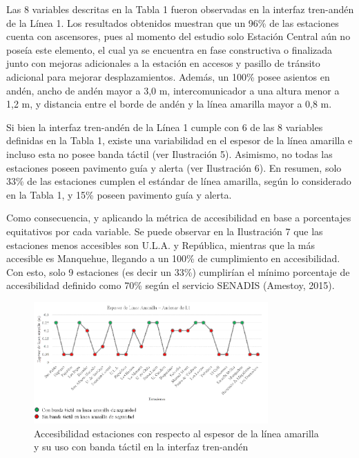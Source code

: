 Las 8 variables descritas en la Tabla 1 fueron observadas en la interfaz tren-andén de la Línea 1. Los resultados obtenidos muestran que un 96\% de las estaciones cuenta con ascensores, pues al momento del estudio solo Estación Central aún no poseía este elemento, el cual ya se encuentra en fase constructiva o finalizada junto con mejoras adicionales a la estación en accesos y pasillo de tránsito adicional para mejorar desplazamientos. Además, un 100\% posee asientos en andén, ancho de andén mayor a 3,0 m, intercomunicador a una altura menor a 1,2 m, y distancia entre el borde de andén y la línea amarilla mayor a 0,8 m. 

Si bien la interfaz tren-andén de la Línea 1 cumple con 6 de las 8 variables definidas en la Tabla 1, existe una variabilidad en el espesor de la línea amarilla e incluso esta no posee banda táctil (ver Ilustración 5). Asimismo, no todas las estaciones poseen pavimento guía y alerta (ver Ilustración 6). En resumen, solo 33\% de las estaciones cumplen el estándar de línea amarilla, según lo considerado en la Tabla 1, y 15\% poseen pavimento guía y alerta. 

Como consecuencia, y aplicando la métrica de accesibilidad en base a porcentajes equitativos por cada variable. Se puede observar en la Ilustración 7 que las estaciones menos accesibles son U.L.A. y República, mientras que la más accesible es Manquehue, llegando a un 100\% de cumplimiento en accesibilidad. Con esto, solo 9 estaciones (es decir un 33\%) cumplirían el mínimo porcentaje de accesibilidad definido como 70\% según el servicio SENADIS (Amestoy, 2015).



\begin{figure}
    \centering
    \includegraphics[width=0.8\textwidth]{imagenes/ilustracion_6.png}
    \caption{Accesibilidad estaciones con respecto al espesor de la línea amarilla y su uso con banda táctil en la interfaz tren-andén}\label{fig6}
\end{figure}

